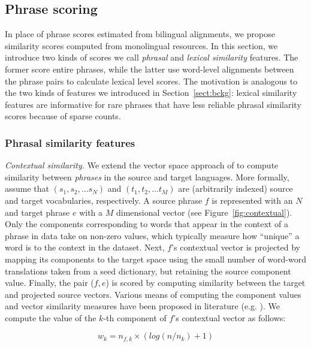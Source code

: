 \documentclass[11pt]{article}
\newcommand{\secref}[1]{Section~\ref{#1}}
\newcommand{\figref}[1]{Figure~\ref{#1}}
\newcommand{\paraheader}[1]{\vskip 0.08in \noindent\emph{#1}}
\begin{document}
\subsection{Phrase scoring} \label{sect:score}

In place of phrase scores estimated from bilingual alignments, we propose similarity scores computed  from monolingual resources.  In this section, we introduce two kinds of scores we call {\em phrasal} and {\em lexical similarity} features.  The former score entire phrases, while the latter use word-level alignments between the phrase pairs to calculate lexical level scores.  The motivation is analogous to the two kinds of features we introduced in \secref{sect:bckg}: lexical similarity features are informative for rare phrases that have less reliable phrasal similarity scores because of sparse counts. 

\subsubsection{Phrasal similarity features} \label{sect:phrasalfeats}

\paraheader{Contextual similarity.}  We extend the vector space approach of  to compute similarity between \emph{phrases} in the source and target languages.  More formally, assume that $(s_{1}, s_{2}, \dots s_{N})$ and $(t_{1}, t_{2}, \dots t_{M})$ are (arbitrarily indexed) source and target vocabularies, respectively.  A source phrase $f$ is represented with an $N$ and target phrase $e$ with a $M$ dimensional vector (see \figref{fig:contextual}).  Only the components corresponding to words that appear in the context of a phrase in data take on non-zero values, which typically measure how ``unique'' a word is to the context in the dataset.  Next, $f$'s contextual vector is projected by mapping its components to the target space using the small number of word-word translations taken from a seed dictionary, but retaining the source component value.  Finally, the pair ($f, e$) is scored by computing similarity between the target  and projected source vectors.  Various means of computing the component values and vector similarity measures have been proposed in literature (e.g. ).  We compute the value of the $k$-th component of $f$'s contextual vector  as follows: 

\begin{equation*}
w_{k} = n_{f,k} \times (log( {n / n_{k}}) + 1)
\end{equation*}
\end{document}
